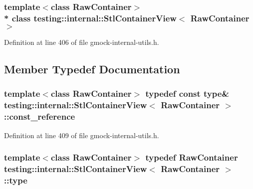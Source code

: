 \subsubsection*{template$<$class Raw\+Container$>$\\*
class testing\+::internal\+::\+Stl\+Container\+View$<$ Raw\+Container $>$}



Definition at line 406 of file gmock-\/internal-\/utils.\+h.



\subsection{Member Typedef Documentation}
\subsubsection[{\texorpdfstring{const\+\_\+reference}{const_reference}}]{\setlength{\rightskip}{0pt plus 5cm}template$<$class Raw\+Container$>$ typedef const {\bf type}\& {\bf testing\+::internal\+::\+Stl\+Container\+View}$<$ Raw\+Container $>$\+::{\bf const\+\_\+reference}}\hypertarget{classtesting_1_1internal_1_1_stl_container_view_a9cd4f6ed689b3938cdb7b3c4cbf1b36b}{}\label{classtesting_1_1internal_1_1_stl_container_view_a9cd4f6ed689b3938cdb7b3c4cbf1b36b}


Definition at line 409 of file gmock-\/internal-\/utils.\+h.

\subsubsection[{\texorpdfstring{type}{type}}]{\setlength{\rightskip}{0pt plus 5cm}template$<$class Raw\+Container$>$ typedef Raw\+Container {\bf testing\+::internal\+::\+Stl\+Container\+View}$<$ Raw\+Container $>$\+::{\bf type}}\hypertarget{classtesting_1_1internal_1_1_stl_container_view_a2b2c63a6dcdbfe63fb0ee121ebf463ba}{}\label{classtesting_1_1internal_1_1_stl_container_view_a2b2c63a6dcdbfe63fb0ee121ebf463ba}



